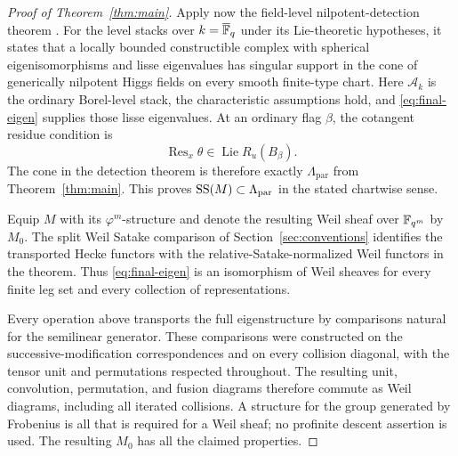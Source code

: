 \begin{proof}[Proof of Theorem~\ref{thm:main}]
Apply now the field-level nilpotent-detection theorem
\cite[Theorem~4.1]{CT}.  For the level stacks over
$k=\overline{\mathbb F}_q$ under its Lie-theoretic hypotheses, it states
that a locally bounded constructible
complex with spherical eigenisomorphisms and lisse eigenvalues
has singular support in the cone of generically nilpotent Higgs
fields on every smooth finite-type chart.  Here $\mathscr A_k$
is the ordinary Borel-level stack, the characteristic assumptions
hold, and \eqref{eq:final-eigen} supplies those lisse eigenvalues.
At an ordinary flag $\beta$, the cotangent residue condition is
\[
 \operatorname{Res}_{x}\theta
        \in\operatorname{Lie}R_u(B_\beta).
\]
The cone in the detection theorem is therefore exactly
$\Lambda_{\mathrm{par}}$ from Theorem~\ref{thm:main}.  This proves
$\operatorname{SS}(M)\subset\Lambda_{\mathrm{par}}$ in the stated chartwise sense.

Equip $M$ with its $\varphi^m$-structure and denote the resulting
Weil sheaf over $\mathbb F_{q^m}$ by $M_0$.  The split Weil Satake
comparison of Section~\ref{sec:conventions} identifies the
transported Hecke functors with the relative-Satake-normalized
Weil functors in the theorem.  Thus \eqref{eq:final-eigen} is an
isomorphism of Weil sheaves for every finite leg set and every
collection of representations.

Every operation above transports the full eigenstructure by
comparisons natural for the semilinear generator.  These
comparisons were constructed on the successive-modification
correspondences and on every collision diagonal, with the tensor
unit and permutations respected throughout.  The resulting
unit, convolution, permutation, and fusion diagrams therefore
commute as Weil diagrams, including all iterated collisions.
A structure for the group generated by Frobenius is all that is
required for a Weil sheaf; no profinite descent assertion is
used.  The resulting $M_0$ has all the claimed properties.
\end{proof}
